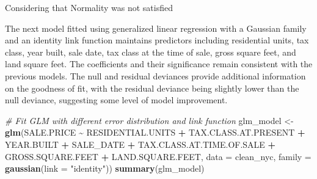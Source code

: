 \documentclass[
]{article}
\newenvironment{Shaded}{\begin{snugshade}}{\end{snugshade}}
\newcommand{\AttributeTok}[1]{\textcolor[rgb]{0.13,0.29,0.53}{#1}}
\newcommand{\CommentTok}[1]{\textcolor[rgb]{0.56,0.35,0.01}{\textit{#1}}}
\newcommand{\FunctionTok}[1]{\textcolor[rgb]{0.13,0.29,0.53}{\textbf{#1}}}
\newcommand{\NormalTok}[1]{#1}
\newcommand{\OtherTok}[1]{\textcolor[rgb]{0.56,0.35,0.01}{#1}}
\newcommand{\SpecialCharTok}[1]{\textcolor[rgb]{0.81,0.36,0.00}{\textbf{#1}}}
\newcommand{\StringTok}[1]{\textcolor[rgb]{0.31,0.60,0.02}{#1}}
\begin{document}
Considering that Normality was not satisfied

The next model fitted using generalized linear regression with a
Gaussian family and an identity link function maintains predictors
including residential units, tax class, year built, sale date, tax class
at the time of sale, gross square feet, and land square feet. The
coefficients and their significance remain consistent with the previous
models. The null and residual deviances provide additional information
on the goodness of fit, with the residual deviance being slightly lower
than the null deviance, suggesting some level of model improvement.

\begin{Shaded}
\begin{Highlighting}[]
\CommentTok{\# Fit GLM with different error distribution and link function}
\NormalTok{glm\_model }\OtherTok{\textless{}{-}} \FunctionTok{glm}\NormalTok{(SALE.PRICE }\SpecialCharTok{\textasciitilde{}}\NormalTok{ RESIDENTIAL.UNITS }\SpecialCharTok{+}\NormalTok{ TAX.CLASS.AT.PRESENT }\SpecialCharTok{+}\NormalTok{ YEAR.BUILT }\SpecialCharTok{+}\NormalTok{ SALE\_DATE }\SpecialCharTok{+}\NormalTok{ TAX.CLASS.AT.TIME.OF.SALE }\SpecialCharTok{+}\NormalTok{ GROSS.SQUARE.FEET }\SpecialCharTok{+}\NormalTok{ LAND.SQUARE.FEET, }
                 \AttributeTok{data =}\NormalTok{ clean\_nyc, }
                 \AttributeTok{family =} \FunctionTok{gaussian}\NormalTok{(}\AttributeTok{link =} \StringTok{"identity"}\NormalTok{))}
\FunctionTok{summary}\NormalTok{(glm\_model)}
\end{Highlighting}
\end{Shaded}
\end{document}
